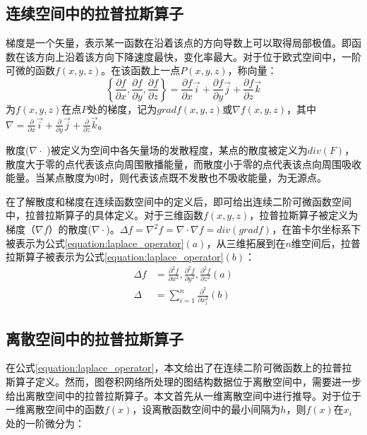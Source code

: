 \subsection{连续空间中的拉普拉斯算子}
梯度是一个矢量，表示某一函数在沿着该点的方向导数上可以取得局部极值。即函数在该方向上沿着该方向下降速度最快，变化率最大。对于位于欧式空间中，一阶可微的函数$f(x,y,z)$。在该函数上一点$P(x,y,z)$，称向量：
\begin{equation}
    \left\{ \frac{\partial f}{\partial x}, \frac{\partial f}{\partial y}, \frac{\partial f}{\partial z} \right\}= \frac{\partial f}{\partial x}\vec{i} + \frac{\partial f}{\partial y}\vec{j} + \frac{\partial f}{\partial z}\vec{k}
    \label{equation:grad}
\end{equation}
为$f(x,y,z)$在点$P$处的梯度，记为$gradf(x,y,z)$或$\nabla f(x,y,z)$，其中$\nabla = \frac{\partial}{\partial x}\vec{i} + \frac{\partial}{\partial y}\vec{j} + \frac{\partial}{\partial z}\vec{k}$。

散度($\nabla \cdot$ )被定义为空间中各矢量场的发散程度，某点的散度被定义为$div(F)$，散度大于零的点代表该点向周围散播能量，而散度小于零的点代表该点向周围吸收能量。当某点散度为0时，则代表该点既不发散也不吸收能量，为无源点。

在了解散度和梯度在连续函数空间中的定义后，即可给出连续二阶可微函数空间中，拉普拉斯算子的具体定义。对于三维函数$f(x,y,z)$，拉普拉斯算子被定义为梯度（$\nabla f$）的散度($\nabla \cdot$)。$\Delta f = \nabla^2 f = \nabla \cdot \nabla f = div(grad f)$，在笛卡尔坐标系下被表示为公式\ref{equation:laplace_operator}$(a)$，从三维拓展到在$n$维空间后，拉普拉斯算子被表示为公式\ref{equation:laplace_operator}$(b)$：
\begin{equation}
    \begin{aligned}
        \Delta f &= \frac{\partial^2 f}{\partial x^2}, \frac{\partial^2 f}{\partial y^2}, \frac{\partial^2 f}{\partial z^2} (a)
        \\
        \Delta &= \sum_{i=1}^{n} \frac{\partial^2}{\partial x^2_i} (b)
   \end{aligned}
    \label{equation:laplace_operator}
\end{equation}

\subsection{离散空间中的拉普拉斯算子}\label{discrate_laplace}
在公式\ref{equation:laplace_operator}，本文给出了在连续二阶可微函数上的拉普拉斯算子定义。然而，图卷积网络所处理的图结构数据位于离散空间中，需要进一步给出离散空间中的拉普拉斯算子。本文首先从一维离散空间中进行推导。对于位于一维离散空间中的函数$f(x)$，设离散函数空间中的最小间隔为$h$，则$f(x)$在$x_i$处的一阶微分为：

